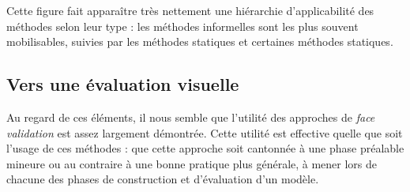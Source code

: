 Cette figure fait apparaître très nettement une \og hiérarchie\fg{} d'applicabilité des méthodes selon leur type : les méthodes informelles sont les plus souvent mobilisables, suivies par les méthodes statiques et certaines méthodes statiques.

\subsection{Vers une évaluation visuelle \label{subsec:eval-visuelle}}

Au regard de ces éléments, il nous semble que l'utilité des approches de \textit{face validation} est assez largement démontrée.
Cette utilité est effective quelle que soit l'usage de ces méthodes : que cette approche soit cantonnée à une phase préalable mineure ou au contraire à une bonne pratique plus générale, à mener lors de chacune des phases de construction et d'évaluation d'un modèle.

